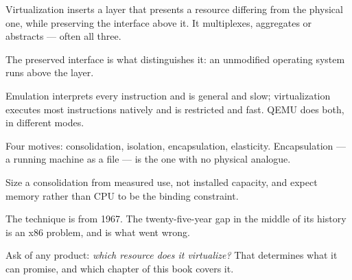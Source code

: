 \begin{chaptersummary}
\begin{tight}
  \item Virtualization inserts a layer that presents a resource differing from
        the physical one, while preserving the interface above it. It
        multiplexes, aggregates or abstracts --- often all three.
  \item The preserved interface is what distinguishes it: an unmodified
        operating system runs above the layer.
  \item Emulation interprets every instruction and is general and slow;
        virtualization executes most instructions natively and is restricted
        and fast. QEMU does both, in different modes.
  \item Four motives: consolidation, isolation, encapsulation, elasticity.
        Encapsulation --- a running machine as a file --- is the one with no
        physical analogue.
  \item Size a consolidation from measured use, not installed capacity, and
        expect memory rather than CPU to be the binding constraint.
  \item The technique is from 1967. The twenty-five-year gap in the middle of
        its history is an x86 problem, and  is what went wrong.
  \item Ask of any product: \emph{which resource does it virtualize?} That
        determines what it can promise, and which chapter of this book covers
        it.
\end{tight}
\end{chaptersummary}


